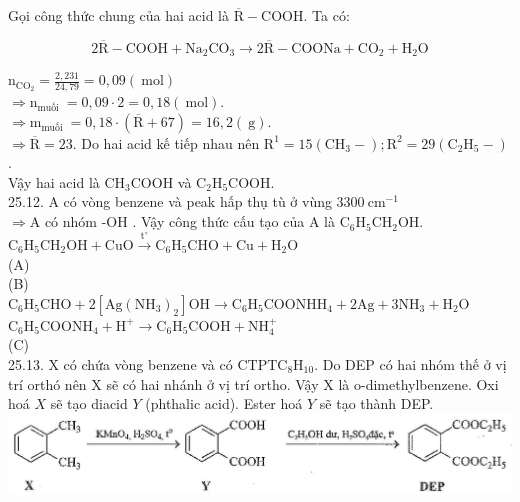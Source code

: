\documentclass[10pt]{article}
\begin{document}
Gọi công thức chung của hai acid là $\overline{\mathrm{R}}-\mathrm{COOH}$. Ta có:

$$
2 \overline{\mathrm{R}}-\mathrm{COOH}+\mathrm{Na}_{2} \mathrm{CO}_{3} \rightarrow 2 \overline{\mathrm{R}}-\mathrm{COONa}+\mathrm{CO}_{2}+\mathrm{H}_{2} \mathrm{O}
$$

$\mathrm{n}_{\mathrm{CO}_{2}}=\frac{2,231}{24,79}=0,09(\mathrm{~mol})$\\
$\Rightarrow \mathrm{n}_{\text {muối }}=0,09 \cdot 2=0,18(\mathrm{~mol})$.\\
$\Rightarrow \mathrm{m}_{\text {muối }}=0,18 \cdot(\overline{\mathrm{R}}+67)=16,2(\mathrm{~g})$.\\
$\Rightarrow \overline{\mathrm{R}}=23$. Do hai acid kế tiếp nhau nên $\mathrm{R}^{1}=15\left(\mathrm{CH}_{3}-\right) ; \mathrm{R}^{2}=29\left(\mathrm{C}_{2} \mathrm{H}_{5}-\right)$.\\
Vậy hai acid là $\mathrm{CH}_{3} \mathrm{COOH}$ và $\mathrm{C}_{2} \mathrm{H}_{5} \mathrm{COOH}$.\\
25.12. A có vòng benzene và peak hấp thụ tù ở vùng $3300 \mathrm{~cm}^{-1}$\\
$\Rightarrow \mathrm{A}$ có nhóm -OH . Vậy công thức cấu tạo của A là $\mathrm{C}_{6} \mathrm{H}_{5} \mathrm{CH}_{2} \mathrm{OH}$.\\
$\mathrm{C}_{6} \mathrm{H}_{5} \mathrm{CH}_{2} \mathrm{OH}+\mathrm{CuO} \xrightarrow{\mathrm{t}^{\circ}} \mathrm{C}_{6} \mathrm{H}_{5} \mathrm{CHO}+\mathrm{Cu}+\mathrm{H}_{2} \mathrm{O}$\\
(A)\\
(B)\\
$\mathrm{C}_{6} \mathrm{H}_{5} \mathrm{CHO}+2\left[\mathrm{Ag}\left(\mathrm{NH}_{3}\right)_{2}\right] \mathrm{OH} \longrightarrow \mathrm{C}_{6} \mathrm{H}_{5} \mathrm{COONH} \mathrm{H}_{4}+2 \mathrm{Ag}+3 \mathrm{NH}_{3}+\mathrm{H}_{2} \mathrm{O}$\\
$\mathrm{C}_{6} \mathrm{H}_{5} \mathrm{COONH}_{4}+\mathrm{H}^{+} \longrightarrow \mathrm{C}_{6} \mathrm{H}_{5} \mathrm{COOH}+\mathrm{NH}_{4}^{+}$\\
(C)\\
25.13. X có chứa vòng benzene và có $\mathrm{CTPT} \mathrm{C}_{8} \mathrm{H}_{10}$. Do DEP có hai nhóm thế ở vị trí orthó nên X sẽ có hai nhánh ở vị trí ortho. Vậy X là o-dimethylbenzene. Oxi hoá $X$ sẽ tạo diacid $Y$ (phthalic acid). Ester hoá $Y$ sẽ tạo thành DEP.\\
\includegraphics[max width=\textwidth, center]{2025_10_23_ed7118e3280f74e91193g-42}
\end{document}
